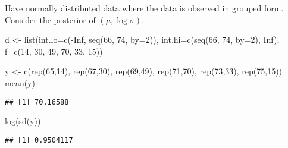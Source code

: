 \documentclass[
]{book}
\newenvironment{Shaded}{\begin{snugshade}}{\end{snugshade}}
\newcommand{\AttributeTok}[1]{\textcolor[rgb]{0.77,0.63,0.00}{#1}}
\newcommand{\ConstantTok}[1]{\textcolor[rgb]{0.00,0.00,0.00}{#1}}
\newcommand{\DecValTok}[1]{\textcolor[rgb]{0.00,0.00,0.81}{#1}}
\newcommand{\FunctionTok}[1]{\textcolor[rgb]{0.00,0.00,0.00}{#1}}
\newcommand{\NormalTok}[1]{#1}
\newcommand{\OtherTok}[1]{\textcolor[rgb]{0.56,0.35,0.01}{#1}}
\newcommand{\SpecialCharTok}[1]{\textcolor[rgb]{0.00,0.00,0.00}{#1}}
\begin{document}
Have normally distributed data where the data is observed in grouped form. Consider the posterior of \((\mu, \log \sigma)\).

\begin{Shaded}
\begin{Highlighting}[]
\NormalTok{d }\OtherTok{\textless{}{-}} \FunctionTok{list}\NormalTok{(}\AttributeTok{int.lo=}\FunctionTok{c}\NormalTok{(}\SpecialCharTok{{-}}\ConstantTok{Inf}\NormalTok{, }\FunctionTok{seq}\NormalTok{(}\DecValTok{66}\NormalTok{, }\DecValTok{74}\NormalTok{, }\AttributeTok{by=}\DecValTok{2}\NormalTok{)),}
        \AttributeTok{int.hi=}\FunctionTok{c}\NormalTok{(}\FunctionTok{seq}\NormalTok{(}\DecValTok{66}\NormalTok{, }\DecValTok{74}\NormalTok{, }\AttributeTok{by=}\DecValTok{2}\NormalTok{), }\ConstantTok{Inf}\NormalTok{),}
        \AttributeTok{f=}\FunctionTok{c}\NormalTok{(}\DecValTok{14}\NormalTok{, }\DecValTok{30}\NormalTok{, }\DecValTok{49}\NormalTok{, }\DecValTok{70}\NormalTok{, }\DecValTok{33}\NormalTok{, }\DecValTok{15}\NormalTok{))}
\end{Highlighting}
\end{Shaded}

\begin{Shaded}
\begin{Highlighting}[]
\NormalTok{y }\OtherTok{\textless{}{-}} \FunctionTok{c}\NormalTok{(}\FunctionTok{rep}\NormalTok{(}\DecValTok{65}\NormalTok{,}\DecValTok{14}\NormalTok{), }\FunctionTok{rep}\NormalTok{(}\DecValTok{67}\NormalTok{,}\DecValTok{30}\NormalTok{), }\FunctionTok{rep}\NormalTok{(}\DecValTok{69}\NormalTok{,}\DecValTok{49}\NormalTok{),}
       \FunctionTok{rep}\NormalTok{(}\DecValTok{71}\NormalTok{,}\DecValTok{70}\NormalTok{), }\FunctionTok{rep}\NormalTok{(}\DecValTok{73}\NormalTok{,}\DecValTok{33}\NormalTok{), }\FunctionTok{rep}\NormalTok{(}\DecValTok{75}\NormalTok{,}\DecValTok{15}\NormalTok{))}
\FunctionTok{mean}\NormalTok{(y)}
\end{Highlighting}
\end{Shaded}

\begin{verbatim}
## [1] 70.16588
\end{verbatim}

\begin{Shaded}
\begin{Highlighting}[]
\FunctionTok{log}\NormalTok{(}\FunctionTok{sd}\NormalTok{(y))}
\end{Highlighting}
\end{Shaded}

\begin{verbatim}
## [1] 0.9504117
\end{verbatim}
\end{document}
